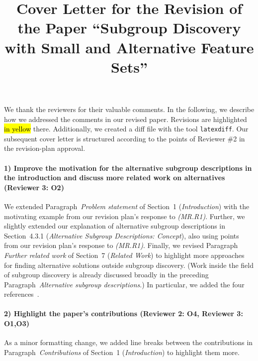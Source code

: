 \documentclass{article}
\title{\vspace{-15mm}Cover Letter for the Revision of the Paper ``Subgroup Discovery with Small and Alternative Feature Sets''} %
\author{} %
\date{} %
\begin{document}
\maketitle
\vspace{-15mm}

We thank the reviewers for their valuable comments.
In the following, we describe how we addressed the comments in our revised paper.
Revisions are highlighted \hl{in yellow} there.
Additionally, we created a diff file with the tool \texttt{latexdiff}.
Our subsequent cover letter is structured according to the points of Reviewer \#2 in the revision-plan approval.

\paragraph{1) Improve the motivation for the alternative subgroup descriptions in the introduction and discuss more related work on alternatives (Reviewer 3: O2)}

We extended Paragraph~\emph{Problem statement} of Section~1 (\emph{Introduction}) with the motivating example from our revision plan's response to \emph{(MR.R1)}.
Further, we slightly extended our explanation of alternative subgroup descriptions in Section~4.3.1 (\emph{Alternative Subgroup Descriptions: Concept}), also using points from our revision plan's response to \emph{(MR.R1)}.
Finally, we revised Paragraph \emph{Further related work} of Section~7 (\emph{Related Work}) to highlight more approaches for finding alternative solutions outside subgroup discovery.
(Work inside the field of subgroup discovery is already discussed broadly in the preceding Paragraph~\emph{Alternative subgroup descriptions}.)
In particular, we added the four references~\cite{artelt2022even, bailey2014alternative, fouche2021efficient, kim2016examples}.

\paragraph{2) Highlight the paper’s contributions (Reviewer 2: O4, Reviewer 3: O1,O3)}

As a minor formatting change, we added line breaks between the contributions in Paragraph~\emph{Contributions} of Section~1 (\emph{Introduction}) to highlight them more.
\end{document}
